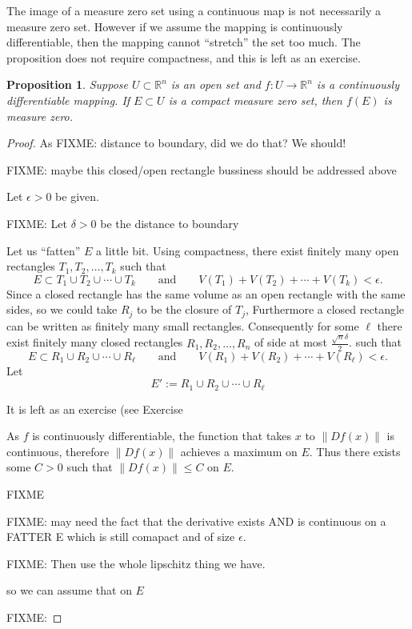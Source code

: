 \documentclass[12pt]{book}
\newcommand{\norm}[1]{\left\lVert {#1} \right\rVert}
\newcommand{\R}{{\mathbb{R}}}
\theoremstyle{plain}
\newtheorem{prop}[thm]{Proposition}
\theoremstyle{remark}
\theoremstyle{definition}
\theoremstyle{exercise}
\theoremstyle{example}
\begin{document}
The image of a measure zero set using a continuous map is not necessarily
a measure zero set.  However if we assume the mapping is continuously
differentiable, then the mapping cannot ``stretch'' the set too much.
The proposition does not require compactness, and this is left as an
exercise.

\begin{prop} \label{prop:imagenull}
Suppose $U \subset \R^n$ is an open set and $f \colon U \to \R^n$
is a continuously differentiable mapping.  If $E \subset U$ is a 
compact measure zero set, then $f(E)$ is measure zero.
\end{prop}

\begin{proof}
As FIXME: distance to boundary, did we do that?  We should!

FIXME: maybe this closed/open rectangle bussiness should be addressed above

Let $\epsilon > 0$ be given.

FIXME: Let $\delta > 0$ be the distance to boundary

Let us ``fatten'' $E$ a little bit.
Using compactness, there exist finitely
many open rectangles $T_1,T_2,\ldots,T_k$ such that
\begin{equation*}
E \subset T_1 \cup T_2 \cup \cdots \cup T_k
\qquad \text{and} \qquad
V(T_1) + V(T_2) + \cdots + V(T_k) < \epsilon .
\end{equation*}
Since a closed rectangle has the same volume as an open rectangle
with the same sides, so we could take $R_j$ to be the closure of $T_j$,
Furthermore a closed rectangle can be written as finitely many small
rectangles.   Consequently for some $\ell$ there exist finitely many
closed rectangles $R_1,R_2,\ldots,R_n$ of side at most
$\frac{\sqrt{n}\delta}{2}$. such that
\begin{equation*}
E \subset R_1 \cup R_2 \cup \cdots \cup R_\ell
\qquad \text{and} \qquad
V(R_1) + V(R_2) + \cdots + V(R_\ell) < \epsilon .
\end{equation*}
Let
\begin{equation*}
E' := R_1 \cup R_2 \cup \cdots \cup R_\ell
\end{equation*}


It is left as an exercise (see Exercise





As $f$ is continuously differentiable,
the function that takes $x$ to $\norm{Df(x)}$ is continuous, therefore
$\norm{Df(x)}$ achieves a maximum on $E$.  Thus there exists some $C > 0$
such that $\norm{Df(x)} \leq C$ on $E$.

FIXME





FIXME: may need the fact that the derivative exists AND is continuous
on a FATTER E which is still comapact and of size $\epsilon$.

FIXME: Then use the whole lipschitz thing we have.



so we can assume that on $E$

FIXME:
\end{proof}
\end{document}
